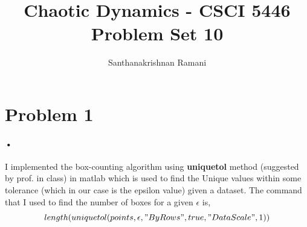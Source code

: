 \documentclass{article}
\title{\textbf{Chaotic Dynamics - CSCI 5446} \\
Problem Set 10}
\author{Santhanakrishnan Ramani}
\begin{document}
\maketitle
\section*{Problem 1}
\paragraph{•}
I implemented the box-counting algorithm using \textbf{uniquetol} method (suggested by prof. in class) in matlab which is used to find the Unique values within some tolerance (which in our case is the epsilon value) given a dataset. The command that I used to find the number of boxes for a given $\epsilon$ is,\\
$$length(uniquetol(points,\epsilon,"ByRows",true,"DataScale",1))$$
\end{document}
